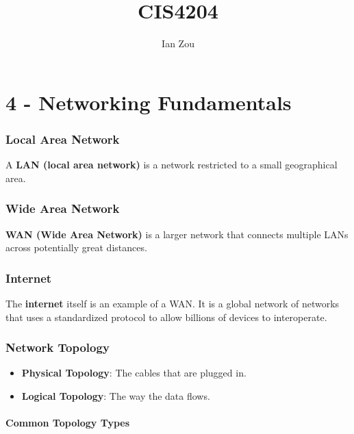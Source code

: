 \documentclass[12pt, letterpaper]{article}
\title{CIS4204}
\author{Ian Zou}
\begin{document}
\maketitle

\part*{4 - Networking Fundamentals}

\section*{Local Area Network}

A \textbf{LAN (local area network)} is a network restricted to a small geographical area.

\section*{Wide Area Network}

\textbf{WAN (Wide Area Network)} is a larger network that connects multiple LANs across potentially great distances.

\section*{Internet}

The \textbf{internet} itself is an example of a WAN. It is a global network of networks that uses a standardized protocol to allow billions of devices to interoperate.

\section*{Network Topology}

\begin{itemize}
    \item \textbf{Physical Topology}: The cables that are plugged in.
    \item \textbf{Logical Topology}: The way the data flows.
\end{itemize}

\subsection*{Common Topology Types}
\end{document}
